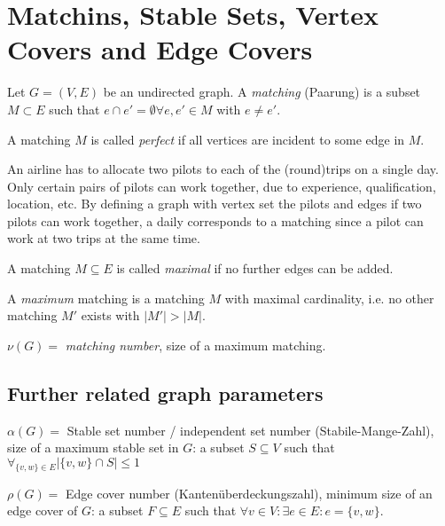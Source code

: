 \begin{lec}[2011-10-31]\end{lec}

\section{Matchins, Stable Sets, Vertex Covers and Edge Covers}

\begin{def}
Let $G = (V, E)$ be an undirected graph. A \emph{matching} (Paarung) is a
subset $M \subset E$ such that $e \cap e' = \emptyset \forall e, e' \in M$
with $e \neq e'$.

A matching $M$ is called \emph{perfect} if all vertices are incident to
some edge in $M$.
\end{def}

\begin{ex+}
An airline has to allocate two pilots to each of the (round)trips on a
single day. Only certain pairs of pilots can work together, due to
experience, qualification, location, etc. By defining a graph with vertex
set the pilots and edges if two pilots can work together, a daily
corresponds to a matching since a pilot can work at two trips at the same
time.
\end{ex+}

\begin{def}
A matching $M \subseteq E$ is called \emph{maximal} if no further edges can
be added.

A \emph{maximum} matching is a matching $M$ with maximal cardinality, i.e.
no other matching $M'$ exists with $|M'| > |M|$.

$\nu(G) =$ \emph{matching number}, size of a maximum matching.
\end{def}

\subsection{Further related graph parameters}
$\alpha(G) = $ Stable set number / independent set number (Stabile-Mange-Zahl), size of a maximum stable set in
$G$: a subset $S \subseteq V$ such that $\forall_{\{v, w\} \in E} \left|
\{v, w\} \cap S \right| \leq 1$

$\rho(G) = $ Edge cover number (Kantenüberdeckungszahl), minimum size of an
edge cover of $G$: a subset $F \subseteq E$ such that $\forall v \in V:
\exists e \in E: e = \{ v, w \}$.